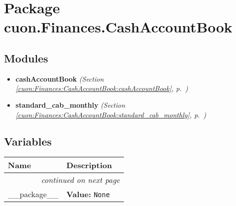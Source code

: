 %
%
%


\section{Package cuon.Finances.CashAccountBook}

    \label{cuon:Finances:CashAccountBook}


\subsection{Modules}

\begin{itemize}
\setlength{\parskip}{0ex}
\item \textbf{cashAccountBook}
  \textit{(Section \ref{cuon:Finances:CashAccountBook:cashAccountBook}, p.~\pageref{cuon:Finances:CashAccountBook:cashAccountBook})}

\item \textbf{standard\_cab\_monthly}
  \textit{(Section \ref{cuon:Finances:CashAccountBook:standard_cab_monthly}, p.~\pageref{cuon:Finances:CashAccountBook:standard_cab_monthly})}

\end{itemize}



  \subsection{Variables}

    \vspace{-1cm}
\hspace{\varindent}\begin{longtable}{|p{\varnamewidth}|p{\vardescrwidth}|l}
\cline{1-2}
\cline{1-2} \centering \textbf{Name} & \centering \textbf{Description}& \\
\cline{1-2}
\endhead\cline{1-2}\multicolumn{3}{r}{\small\textit{continued on next page}}\\\endfoot\cline{1-2}
\endlastfoot\raggedright \_\-\_\-p\-a\-c\-k\-a\-g\-e\-\_\-\_\- & \raggedright \textbf{Value:} 
{\tt None}&\\
\cline{1-2}
\end{longtable}

